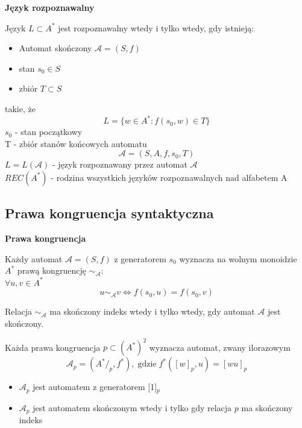 \documentclass[12pt]{article}
\begin{document}
        \begin{definition}
            \textbf{Język rozpoznawalny}

            Język $L \subset A^*$ jest rozpoznawalny wtedy i tylko wtedy, gdy istnieją:
            \begin{itemize}
                \item Automat skończony $\mathcal{A} = (S, f)$
                \item stan $s_0 \in S$
                \item zbiór $T \subset S$
            \end{itemize}

            takie, że
            $$ L = \{w \in A^* : f(s_0, w) \in T\}$$
            $s_0$ - stan początkowy \\
            T - zbiór stanów końcowych automatu
            $$\mathcal{A} = (S, A, f, s_0, T)$$
            $L = L(\mathcal{A})$ - język rozpoznawany przez automat $\mathcal{A}$\\
            $REC(A^*)$ - rodzina wszystkich języków rozpoznawalnych nad alfabetem A
        \end{definition}

        \subsection{Prawa kongruencja syntaktyczna}

        \begin{definition}
            \textbf{Prawa kongruencja}

            Każdy automat $\mathcal{A} = (S, f)$ z generatorem $s_0$ wyznacza na wolnym
            monoidzie $A^*$ prawą kongruencję $\sim_\mathcal{A}$:
            \[\]
            $\forall u, v \in A^*$
            $$u \sim_\mathcal{A} v \Leftrightarrow f(s_0, u) = f(s_0, v)$$

            Relacja $\sim_{\mathcal{A}}$ ma skończony indeks wtedy i tylko wtedy, gdy automat 
            $\mathcal{A}$ jest skończony.
        \end{definition}

        \begin{theorem}
            Każda prawa kongruencja $p \subset (A^*)^2$ wyznacza automat, zwany ilorazowym
            $$\mathcal{A}_p = (A^* /_{p}, f^*), \; \mathrm{gdzie} \; f^*([w]_p, u) = [wu]_p$$
            \begin{itemize}
                \item $\mathcal{A}_p$ jest automatem z generatorem [1]$_p$

                \item $\mathcal{A}_p$ jest automatem skończonym wtedy i tylko gdy relacja $p$ ma skończony indeks 
            \end{itemize}
        \end{theorem}
\end{document}
